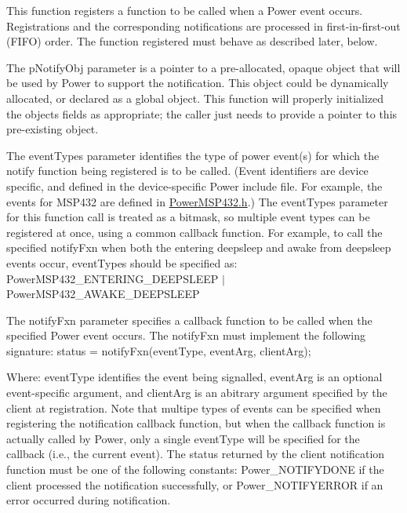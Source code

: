 This function registers a function to be called when a Power event occurs. Registrations and the corresponding notifications are processed in first-\/in-\/first-\/out (F\+I\+F\+O) order. The function registered must behave as described later, below.

The p\+Notify\+Obj parameter is a pointer to a pre-\/allocated, opaque object that will be used by Power to support the notification. This object could be dynamically allocated, or declared as a global object. This function will properly initialized the object\textquotesingle{}s fields as appropriate; the caller just needs to provide a pointer to this pre-\/existing object.

The event\+Types parameter identifies the type of power event(s) for which the notify function being registered is to be called. (Event identifiers are device specific, and defined in the device-\/specific Power include file. For example, the events for M\+S\+P432 are defined in \hyperlink{_power_m_s_p432_8h}{Power\+M\+S\+P432.\+h}.) The event\+Types parameter for this function call is treated as a bitmask, so multiple event types can be registered at once, using a common callback function. For example, to call the specified notify\+Fxn when both the entering deepsleep and awake from deepsleep events occur, event\+Types should be specified as\+: Power\+M\+S\+P432\+\_\+\+E\+N\+T\+E\+R\+I\+N\+G\+\_\+\+D\+E\+E\+P\+S\+L\+E\+E\+P $\vert$ Power\+M\+S\+P432\+\_\+\+A\+W\+A\+K\+E\+\_\+\+D\+E\+E\+P\+S\+L\+E\+E\+P

The notify\+Fxn parameter specifies a callback function to be called when the specified Power event occurs. The notify\+Fxn must implement the following signature\+: status = notify\+Fxn(event\+Type, event\+Arg, client\+Arg);

Where\+: event\+Type identifies the event being signalled, event\+Arg is an optional event-\/specific argument, and client\+Arg is an abitrary argument specified by the client at registration. Note that multipe types of events can be specified when registering the notification callback function, but when the callback function is actually called by Power, only a single event\+Type will be specified for the callback (i.\+e., the current event). The status returned by the client notification function must be one of the following constants\+: Power\+\_\+\+N\+O\+T\+I\+F\+Y\+D\+O\+N\+E if the client processed the notification successfully, or Power\+\_\+\+N\+O\+T\+I\+F\+Y\+E\+R\+R\+O\+R if an error occurred during notification.

